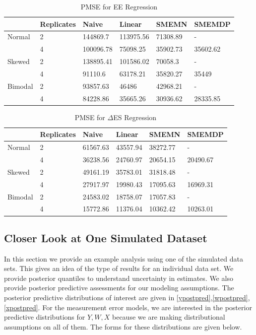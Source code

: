 \documentclass[11pt]{article}\usepackage[]{graphicx}\usepackage[]{color}
\begin{document}
\begin{table}[ht]
\centering
\begin{tabular}{ll|llll}
  \hline
 & Replicates & Naive & Linear & SMEMN & SMEMDP \\ 
  \hline
Normal & 2 & 144869.7 & 113975.56 & 71308.89 & - \\ 
   & 4 & 100096.78 & 75098.25 & 35902.73 & 35602.62 \\ 
  Skewed & 2 & 138895.41 & 101586.02 & 70058.3 & - \\ 
   & 4 & 91110.6 & 63178.21 & 35820.27 & 35449 \\ 
  Bimodal & 2 & 93857.63 & 46486 & 42968.21 & - \\ 
   & 4 & 84228.86 & 35665.26 & 30936.62 & 28335.85 \\ 
   \hline
\end{tabular}
\caption{PMSE for EE Regression} 
\label{pmseee}
\end{table}




\begin{table}[ht]
\centering
\begin{tabular}{ll|llll}
  \hline
 & Replicates & Naive & Linear & SMEMN & SMEMDP \\ 
  \hline
Normal & 2 & 61567.63 & 43557.94 & 38272.77 & - \\ 
   & 4 & 36238.56 & 24760.97 & 20654.15 & 20490.67 \\ 
  Skewed & 2 & 49161.19 & 35783.01 & 31818.48 & - \\ 
   & 4 & 27917.97 & 19980.43 & 17095.63 & 16969.31 \\ 
  Bimodal & 2 & 24583.02 & 18758.07 & 17057.83 & - \\ 
   & 4 & 15772.86 & 11376.04 & 10362.42 & 10263.01 \\ 
   \hline
\end{tabular}
\caption{PMSE for $\Delta$ES Regression} 
\label{pmsees}
\end{table}


\subsection{Closer Look at One Simulated Dataset}
 
In this section we provide an example analysis using one of the simulated data sets. This gives an idea of the type of results for an individual data set. We provide posterior quantiles to understand uncertainty in estimates. We also provide posterior predictive assessments for our modeling assumptions.  The posterior predictive distributions of interest are given in \eqref{ypostpred},\eqref{wpostpred},\eqref{xpostpred}. For the measurement error models, we are interested in the posterior predictive distributions for $Y,W,X$ because we are making distributional assumptions on all of them. The forms for these distributions are given below.
  
\end{document}
